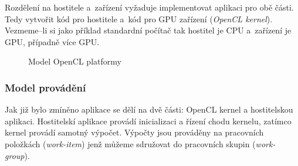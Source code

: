  Rozdělení na hostitele a~zařízení vyžaduje implementovat aplikaci pro obě části. Tedy
vytvořit kód pro hostitele a~kód pro GPU zařízení ({\it OpenCL kernel}). Vezmeme--li si jako
příklad standardní počítač tak hostitel je CPU a~zařízení je GPU, případně více GPU.
\begin{figure}[ht]
    \begin{center}
    \end{center}
    \caption{Model OpenCL platformy \cite{Khronos:2015}}
    \label{platform}
\end{figure}
\subsubsection{Model provádění}
Jak již bylo zmíněno aplikace se dělí na dvě části: OpenCL kernel a hostitelskou aplikaci.
Hostitelskí aplikace provádí inicializaci a řízení chodu kernelu, zatímco kernel provádí samotný
výpočet. Výpočty jsou prováděny na pracovních položkách ({\it work-item}) jenž můžeme sdružovat do
pracovních skupin ({\it work-group}).

